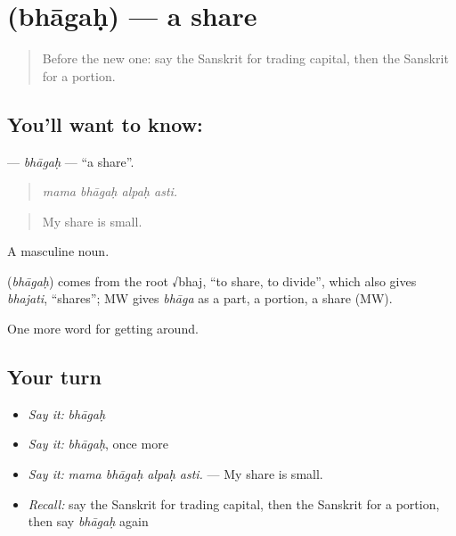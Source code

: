 \section[\texorpdfstring{\sk{भागः} (bhāgaḥ)}{भागः (bhāgaḥ)}]{ (bhāgaḥ) — a share}

\label{lesson:SA-C433-bhagah}



\begin{quote}
Before the new one: say the Sanskrit for trading capital, then the Sanskrit for a portion.
\end{quote}

\subsection*{You'll want to know: }
\textbf{} — \emph{bhāgaḥ} — \textquotedblleft{}a share\textquotedblright{}.

\begin{quote}
   
\end{quote}

\begin{quote}
\emph{mama bhāgaḥ alpaḥ asti.}
\end{quote}

\begin{quote}
My share is small.
\end{quote}

A masculine noun.

\begin{cousinweb}
\textbf{} (\emph{bhāgaḥ}) comes from the root √bhaj, \textquotedblleft{}to share, to divide\textquotedblright{}, which also gives \emph{bhajati}, \textquotedblleft{}shares\textquotedblright{}; MW gives \emph{bhāga} as a part, a portion, a share (MW).
\end{cousinweb}

\begin{grammarlens}[title={What you've built}]
One more word for getting around.
\end{grammarlens}

\subsection*{Your turn}
\begin{itemize}
\raggedright
  \item \emph{Say it:} \emph{bhāgaḥ}
  \item \emph{Say it:} \emph{bhāgaḥ}, once more
  \item \emph{Say it:} \emph{mama bhāgaḥ alpaḥ asti.} — My share is small.
  \item \emph{Recall:} say the Sanskrit for trading capital, then the Sanskrit for a portion, then say \emph{bhāgaḥ} again
\end{itemize}

